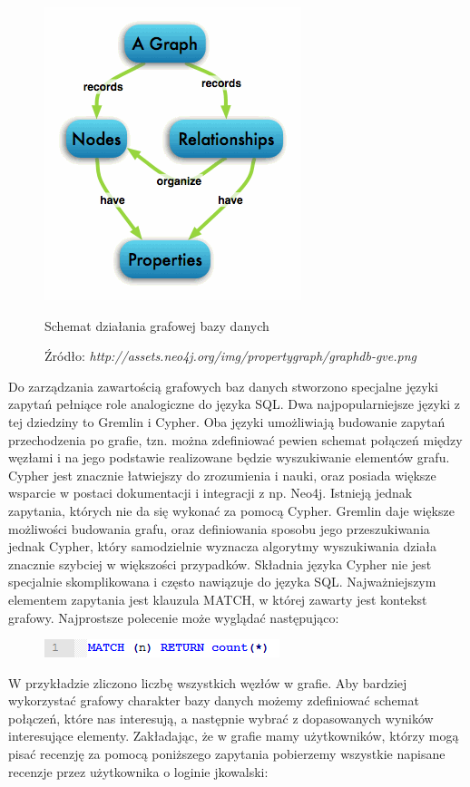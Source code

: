 \begin{figure}[H]
	\centering
	\includegraphics[scale=1]{images/graphdb.png}
	\caption{Schemat działania grafowej bazy danych}
	 \caption*{\small Źródło: \emph{http://assets.neo4j.org/img/propertygraph/graphdb-gve.png}}
	\label{fig:dbschema}
\end{figure}

Do zarządzania zawartością grafowych baz danych stworzono specjalne języki zapytań pełniące role analogiczne do języka SQL.
Dwa najpopularniejsze języki z tej dziedziny to Gremlin i Cypher. Oba języki umożliwiają budowanie zapytań przechodzenia po grafie, tzn. można zdefiniować pewien schemat połączeń między węzłami i na jego podstawie realizowane będzie wyszukiwanie elementów grafu. Cypher jest znacznie łatwiejszy do zrozumienia i nauki, oraz posiada większe wsparcie w postaci dokumentacji i integracji z np. Neo4j. Istnieją jednak zapytania, których nie da się wykonać za pomocą Cypher. Gremlin daje większe możliwości budowania grafu, oraz definiowania sposobu jego przeszukiwania jednak Cypher, który samodzielnie wyznacza algorytmy wyszukiwania działa znacznie szybciej w większości przypadków. Składnia języka Cypher nie jest specjalnie skomplikowana i często nawiązuje do języka SQL. Najważniejszym elementem zapytania jest klauzula MATCH, w której zawarty jest kontekst grafowy. Najprostsze polecenie może wyglądać następująco:

\begin{figure}[H]
	\centering
	\includegraphics{images/cypher_q1.png}
\end{figure}

W przykładzie zliczono liczbę wszystkich węzłów w grafie. Aby bardziej wykorzystać grafowy charakter bazy danych możemy zdefiniować schemat połączeń, które nas interesują, a następnie wybrać z dopasowanych wyników interesujące elementy. Zakładając, że w grafie mamy użytkowników, którzy mogą pisać recenzję za pomocą poniższego zapytania pobierzemy wszystkie napisane recenzje przez użytkownika o loginie jkowalski:

